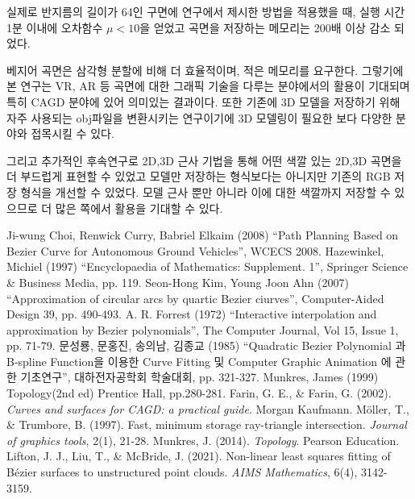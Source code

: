 \documentclass{gshs_thesis}
\theoremstyle{theorem}
\theoremstyle{lemma}
\theoremstyle{definition}
\begin{document}
실제로 반지름의 길이가 64인 구면에 연구에서 제시한 방법을 적용했을 때, 실행 시간 1분 이내에 오차함수 $\mu<10$을 얻었고 곡면을 저장하는 메모리는 200배 이상 감소 되었다. 

베지어 곡면은 삼각형 분할에 비해 더 효율적이며, 적은 메모리를 요구한다. 그렇기에 본 연구는 VR, AR 등 곡면에 대한 그래픽 기술을 다루는 분야에서의 활용이 기대되며 특히 CAGD 분야에 있어 의미있는 결과이다. 또한 기존에 3D 모델을 저장하기 위해 자주 사용되는 obj파일을 변환시키는 연구이기에 3D 모델링이 필요한 보다 다양한 분야와 접목시킬 수 있다. 

그리고 추가적인 후속연구로 2D,3D 근사 기법을 통해 어떤 색깔 있는 2D,3D 곡면을 더 부드럽게 표현할 수 있었고 모델만 저장하는 형식보다는 아니지만 기존의 RGB 저장 형식을 개선할 수 있었다. 
모델 근사 뿐만 아니라 이에 대한 색깔까지 저장할 수 있으므로 더 많은 쪽에서 활용을 기대할 수 있다.
\clearpage
\begin{thebibliography}{99}\begin{onehalfspace}
     Ji-wung Choi, Renwick Curry, Babriel Elkaim (2008) “Path Planning Based on Bezier Curve for Autonomous Ground Vehicles”, WCECS 2008.
    Hazewinkel, Michiel (1997) “Encyclopaedia of Mathematics: Supplement. 1”, Springer Science \& Business Media, pp. 119.
     Seon-Hong Kim, Young Joon Ahn (2007) “Approximation of circular arcs by quartic Bezier ciurves”, Computer-Aided Design 39, pp. 490-493.
     A. R. Forrest (1972) “Interactive interpolation and approximation by Bezier polynomials”, The Computer Journal, Vol 15, Issue 1, pp. 71-79.
     문성룡, 문홍진, 송의남, 김종교 (1985) “Quadratic Bezier Polynomial 과 B-spline Function을 이용한 Curve Fitting 및 Computer Graphic Animation 에 관한 기초연구”, 대하전자공학회 학술대회, pp. 321-327. 
     Munkres, James (1999) Topology(2nd ed) Prentice Hall, pp.280-281.
	 Farin, G. E., \& Farin, G. (2002). \emph{Curves and surfaces for CAGD: a practical guide}. Morgan Kaufmann.
	 Möller, T., \& Trumbore, B. (1997). Fast, minimum storage ray-triangle intersection. \emph{Journal of graphics tools}, 2(1), 21-28.
	 Munkres, J. (2014). \emph{Topology}. Pearson Education.
	 Lifton, J. J., Liu, T., \& McBride, J. (2021). Non-linear least squares fitting of Bézier surfaces to unstructured point clouds. \emph{AIMS Mathematics}, 6(4), 3142-3159.
\end{onehalfspace}\end{thebibliography}
\end{document}
